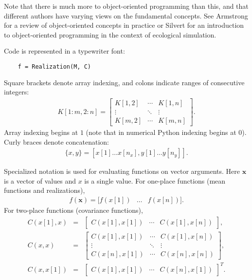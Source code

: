 \documentclass{report}
\begin{document}
Note that there is much more to object-oriented programming than this, and that different authors have varying views on the fundamental concepts. See Armstrong \cite{OOP_review} for a review of object-oriented concepts in practice or Silvert \cite{silvert_OOP} for an introduction to object-oriented programming in the context of ecological simulation.

\medskip
Code is represented in a typewriter font:
\begin{verbatim}
    f = Realization(M, C)
\end{verbatim}
Square brackets denote array indexing, and colons indicate ranges of consecutive integers:
\begin{eqnarray*}
    K[1:m,2:n] = \left[\begin{array}{ccc}
    K[1,2]&\cdots&K[1,n]\\
    \vdots&\ddots&\vdots\\
    K[m,2]&\cdots&K[m,n]
    \end{array}\right].
\end{eqnarray*}
Array indexing begins at $1$ (note that in numerical Python indexing begins at 0). Curly braces denote concatenation:
\begin{eqnarray}
    \{x,y\} = [x[1]\ldots x[n_x], y[1]\ldots y[n_y]].
\end{eqnarray}

Specialized notation is used for evaluating functions on vector arguments. Here $\mathbf x$ is a vector of values and $x$ is a single value. For one-place functions (mean functions and realizations),
\begin{eqnarray}
    f(\mathbf x) = [f(x[1])&\ldots&f(x[n])].
\end{eqnarray}
For two-place functions (covariance functions),
\begin{equation}
    \begin{array}{lll}
        C(x[1], x) &=& \left[
        \begin{array}{ccc}
            C(x[1], x[1]) & \cdots & C(x[1], x[n])
        \end{array}
        \right],\\
        C( x, x) & = &\left[
        \begin{array}{ccc}
            C( x[1], x[1]) & \cdots & C( x[1], x[n]) \\\vdots & \ddots & \vdots \\C( x[n], x[1]) & \cdots & C( x[n], x[n])
        \end{array}
        \right],\\
        C( x,x[1]) & = &\left[
        \begin{array}{ccc}
            C(x[1],x[1]) &\cdots& C(x[n],x[1])
        \end{array}
        \right]^T.
    \end{array}
\end{equation}
\end{document}
